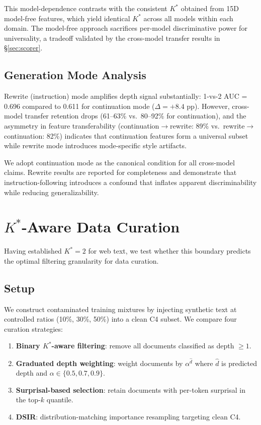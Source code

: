 \documentclass[11pt,a4paper]{article}
\newcommand{\Kstar}{K^{*}}
\begin{document}
This model-dependence contrasts with the consistent $\Kstar$ obtained from 15D model-free features, which yield identical $\Kstar$ across all models within each domain. The model-free approach sacrifices per-model discriminative power for universality, a tradeoff validated by the cross-model transfer results in \S\ref{sec:scorer}.

\subsection{Generation Mode Analysis}
\label{sec:gen_mode}

Rewrite (instruction) mode amplifies depth signal substantially: 1-vs-2 AUC = 0.696 compared to 0.611 for continuation mode ($\Delta = +8.4$ pp). However, cross-model transfer retention drops (61--63\% vs.\ 80--92\% for continuation), and the asymmetry in feature transferability (continuation$\to$rewrite: 89\% vs.\ rewrite$\to$continuation: 82\%) indicates that continuation features form a universal subset while rewrite mode introduces mode-specific style artifacts.

We adopt continuation mode as the canonical condition for all cross-model claims. Rewrite results are reported for completeness and demonstrate that instruction-following introduces a confound that inflates apparent discriminability while reducing generalizability.

\section{$\Kstar$-Aware Data Curation}
\label{sec:curation}

Having established $\Kstar = 2$ for web text, we test whether this boundary predicts the optimal filtering granularity for data curation.

\subsection{Setup}

We construct contaminated training mixtures by injecting synthetic text at controlled ratios (10\%, 30\%, 50\%) into a clean C4 subset. We compare four curation strategies:
\begin{enumerate}[leftmargin=*, itemsep=1pt]
    \item \textbf{Binary $\Kstar$-aware filtering}: remove all documents classified as depth $\geq 1$.
    \item \textbf{Graduated depth weighting}: weight documents by $\alpha^{\hat{d}}$ where $\hat{d}$ is predicted depth and $\alpha \in \{0.5, 0.7, 0.9\}$.
    \item \textbf{Surprisal-based selection}: retain documents with per-token surprisal in the top-$k$ quantile.
    \item \textbf{DSIR}: distribution-matching importance resampling targeting clean C4.
\end{enumerate}
\end{document}

